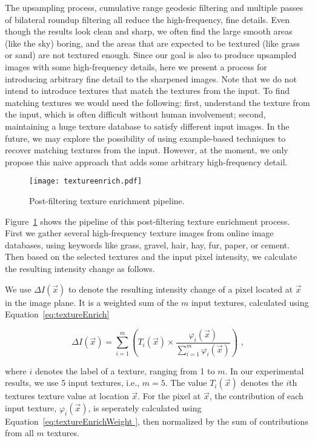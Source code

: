 The upsampling process, cumulative range geodesic filtering and multiple passes of bilateral roundup filtering all reduce the high-frequency, fine details. Even though the results look clean and sharp, we often find the large smooth areas (like the sky) boring, and the areas that are expected to be textured (like grass or sand) are not textured enough. Since our goal is also to produce upsampled images with some high-frequency details, here we present a process for introducing arbitrary fine detail to the sharpened images. Note that we do not intend to introduce textures that match the textures from the input. To find matching textures we would need the following: first, understand the texture from the input, which is often difficult without human involvement; second, maintaining a huge texture database to satisfy different input images. In the future, we may explore the possibility of using example-based techniques to recover matching textures from the input. However, at the moment, we only propose this naive approach that adds some arbitrary high-frequency detail.

\begin{figure}[htbp]
\texttt{[image: textureenrich.pdf]}
\caption{Post-filtering texture enrichment pipeline.}
\label{fig:textureEnrich}
\end{figure}

Figure~\ref{fig:textureEnrich} shows the pipeline of this post-filtering texture enrichment process. First we gather several high-frequency texture images from online image databases, using keywords like grass, gravel, hair, hay, fur, paper, or cement. Then based on the selected textures and the input pixel intensity, we calculate the resulting intensity change as follows.


We use $\Delta I(\vec{x})$ to denote the resulting intensity change of a pixel located at $\vec{x}$ in the image plane. It is a weighted sum of the $m$ input textures, calculated using Equation~\eqref{eq:textureEnrich}

\begin{equation}\label{eq:textureEnrich}
\Delta I(\vec{x}) =    \displaystyle\sum_{i=1}^{m} (T_i(\vec{x})  \times \frac{\varphi_i(\vec{x})}{\displaystyle\sum_{i=1}^{m}\varphi_i(\vec{x})}) \text{ ,}
\end{equation}

where $i$ denotes the label of a texture, ranging from 1 to $m$. In our experimental results, we use 5 input textures, i.e., $m=5$. The value $T_i(\vec{x})$ denotes the $i$th texture\textquotesingle s texture value at location $\vec{x}$. For the pixel at $\vec{x}$, the contribution of each input texture, $\varphi_i(\vec{x})$, is seperately calculated using Equation~\eqref{eq:textureEnrichWeight }, then normalized by the sum of contributions from all $m$ textures.

